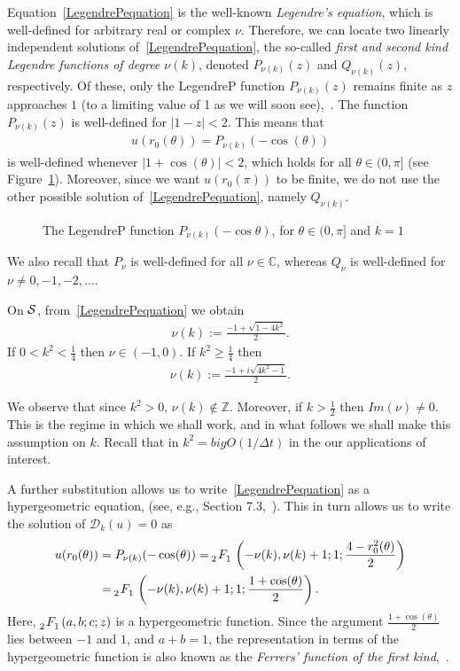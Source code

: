 Equation~\eqref{LegendrePequation} is the well-known {\it Legendre's
equation}, which is well-defined for arbitrary real or complex $\nu$.
Therefore, we can locate two linearly independent solutions
of~\eqref{LegendrePequation}, the so-called {\it first and second kind
Legendre functions of degree $\nu(k)$}, denoted $ P_{\nu(k)}(z)$ and
$Q_{\nu(k)}(z)$, respectively. Of these, only the  LegendreP function
$P_{\nu(k)}(z)$ remains finite as $z$ approaches $1$ (to a limiting
value of 1 as we will soon see),~\cite{lebedev}.  The function
$P_{\nu(k)}(z)$ is well-defined for $|1-z|<2$.  This means that
\begin{align*}
  u(r_0(\theta)) =  P_{\nu(k)}(-\cos(\theta))
\end{align*}
is well-defined whenever $|1+\cos(\theta)|<2$, which holds for all
$\theta \in(0,\pi]$ (see Figure~\ref{f:legendreP}).  Moreover, since we
want $u(r_0(\pi))$ to be finite, we do not use the other possible
solution of~\eqref{LegendrePequation}, namely $Q_{\nu(k)}$.
\begin{figure}[htps]
  \centering
  
  \caption{\label{f:legendreP} The LegendreP function
  $P_{\nu(k)}(-\cos\theta)$, for $\theta \in (0,\pi]$ and $k=1$}
\end{figure}  
We also recall that $P_{\nu}$ is well-defined for all $\nu \in
\mathbb{C}$, whereas $Q_\nu$ is well-defined for $\nu \not=
0,-1,-2,...$. 

On $\S$, from~\eqref{LegendrePequation} we obtain
\begin{align*}  
  \nu(k):=\frac{-1+\sqrt{1-4k^2}}{2}.
\end{align*}
If $0<k^2<\frac{1}{4}$ then $\nu \in (-1,0)$. If $k^2\geq\frac{1}{4}$ then 
\begin{align*}  
  \nu(k):=\frac{-1+i\sqrt{4k^2-1}}{2}.
\end{align*}

We observe that since $k^{2}>0$, $\nu(k) \notin \mathbb{Z}$. Moreover,
if $k>\frac{1}{2}$ then $Im(\nu)\not=0$. This is the regime in which we
shall work, and in what follows we shall make this assumption on $k$.
Recall that in $k^{2} = bigO(1/\Delta t)$ in the our applications of
interest.

A further substitution allows us to write~\eqref{LegendrePequation} as
a hypergeometric equation, (see, e.g., Section 7.3,~\cite{lebedev}).
This in turn allows us to write the solution of $\mathcal{D}_k(u)=0$ as 
\begin{align*} 
  u(r_0(\theta)) &= P_{\nu(k)}(-\cos(\theta)) = 
    \tensor[_2]{F}{_1}\left(-\nu(k), \nu(k)+  1; 1; 
      \frac{4-r_0^2(\theta)}{2}\right) \\
    &=\tensor[_2]{F}{_1}\left(-\nu(k), \nu(k)+  1; 1;
    \frac{1+\cos(\theta)}{2}\right).
\end{align*} 
Here, $\tensor[_2]{F}{_1}(a,b;c;z)$ is a hypergeometric function. Since
the argument $\frac{1+\cos(\theta)}{2}$ lies between $-1$ and $1$, and
$a+b = 1$, the representation in terms of the hypergeometric function is
also known as the {\it Ferrers' function of the first
kind},~\cite{fatAbramowitz}. 

